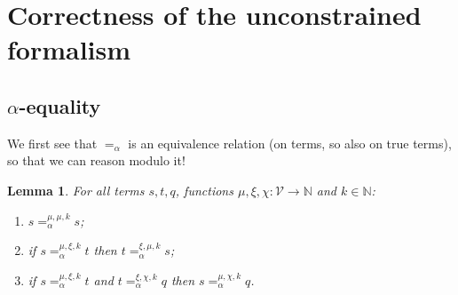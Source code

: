 \documentclass{lmcs}
\theoremstyle{theorem}\newtheorem{theorem}{Theorem}
\theoremstyle{theorem}\newtheorem{lemma}[theorem]{Lemma}
\theoremstyle{theorem}\newtheorem{corollary}[theorem]{Corollary}
\theoremstyle{definition}\newtheorem{definition}[theorem]{Definition}
\theoremstyle{definition}\newtheorem{example}[theorem]{Example}
\newcommand{\N}{\mathbb{N}}
\newcommand{\V}{\mathcal{V}}
\begin{document}
\newpage\appendix

\section{Correctness of the unconstrained formalism}

\subsection{$\alpha$-equality}

We first see that $=_\alpha$ is an equivalence relation (on terms, so also on true terms), so that
we can reason modulo it!

\begin{lemma}\label{lem:alphaequiv}
For all terms $s,t,q$, functions $\mu,\xi,\chi : \V \to \N$ and $k \in \N$:
\begin{enumerate}
\item\label{lem:alphaequiv:reflexive}
  $s =_\alpha^{\mu,\mu,k} s$;
\item\label{lem:alphaequiv:symmetric}
  if $s =_\alpha^{\mu,\xi,k} t$ then $t =_\alpha^{\xi,\mu,k} s$;
\item\label{lem:alphaequiv:transitive}
  if $s =_\alpha^{\mu,\xi,k} t$ and $t =_\alpha^{\xi,\chi,k} q$ then $s =_\alpha^{\mu,\chi,k} q$.
\end{enumerate}
\end{lemma}
\end{document}
